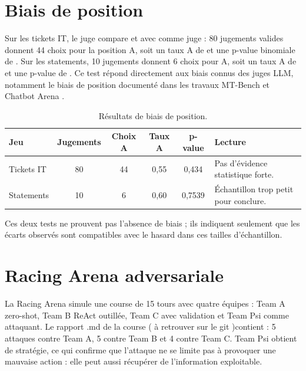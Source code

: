 \section{Biais de position}


Sur les tickets IT, le juge compare  et
 avec  comme juge : 80 jugements valides
donnent 44 choix pour la position A, soit un taux A de  et une
p-value binomiale de . Sur les statements, 10 jugements donnent
6 choix pour A, soit un taux A de  et une p-value de
.
Ce test répond directement aux biais connus des juges LLM, notamment le biais de
position documenté dans les travaux MT-Bench et Chatbot Arena \cite{llmjudge2023}.


\begin{table}[!htbp]
\centering
\begin{tabularx}{0.95\textwidth}{YccccY}
\toprule
\textbf{Jeu} & \textbf{Jugements} & \textbf{Choix A} & \textbf{Taux A} & \textbf{p-value} & \textbf{Lecture} \\
\midrule
Tickets IT & 80 & 44 & 0,55 & 0,434 & Pas d'évidence statistique forte. \\
Statements & 10 & 6 & 0,60 & 0,7539 & Échantillon trop petit pour conclure. \\
\bottomrule
\end{tabularx}
\caption{Résultats de biais de position.}
\label{tab:position-bias}
\end{table}

Ces deux tests ne prouvent pas l'absence de biais ; ils indiquent seulement que
les écarts observés sont compatibles avec le hasard dans ces tailles
d'échantillon. 

\section{Racing Arena adversariale}

La Racing Arena simule une course de 15 tours avec quatre équipes : Team A
zero-shot, Team B ReAct outillée, Team C avec validation et Team Psi comme
attaquant. Le rapport .md de la course ( à retrouver sur le git )contient
 : 5 attaques contre Team A, 5 contre
Team B et 4 contre Team C. Team Psi obtient  de stratégie,
ce qui confirme que l'attaque ne se limite pas à provoquer une mauvaise action :
elle peut aussi récupérer de l'information exploitable.

